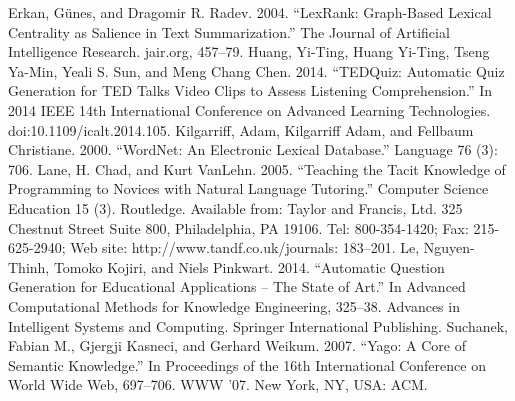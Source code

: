 \documentclass[finalcopy]{srpaper}
\begin{document}


%
%


Erkan, Günes, and Dragomir R. Radev. 2004. “LexRank: Graph-Based Lexical Centrality as Salience in Text Summarization.” The Journal of Artificial Intelligence Research. jair.org, 457–79.
\newline
Huang, Yi-Ting, Huang Yi-Ting, Tseng Ya-Min, Yeali S. Sun, and Meng Chang Chen. 2014. “TEDQuiz: Automatic Quiz Generation for TED Talks Video Clips to Assess Listening Comprehension.” In 2014 IEEE 14th International Conference on Advanced Learning Technologies. doi:10.1109/icalt.2014.105.
\newline
Kilgarriff, Adam, Kilgarriff Adam, and Fellbaum Christiane. 2000. “WordNet: An Electronic Lexical Database.” Language 76 (3): 706.
\newline
Lane, H. Chad, and Kurt VanLehn. 2005. “Teaching the Tacit Knowledge of Programming to Novices with Natural Language Tutoring.” Computer Science Education 15 (3). Routledge. Available from: Taylor and Francis, Ltd. 325 Chestnut Street Suite 800, Philadelphia, PA 19106. Tel: 800-354-1420; Fax: 215-625-2940; Web site: http://www.tandf.co.uk/journals: 183–201.
\newline
Le, Nguyen-Thinh, Tomoko Kojiri, and Niels Pinkwart. 2014. “Automatic Question Generation for Educational Applications – The State of Art.” In Advanced Computational Methods for Knowledge Engineering, 325–38. Advances in Intelligent Systems and Computing. Springer International Publishing.
\newline
Suchanek, Fabian M., Gjergji Kasneci, and Gerhard Weikum. 2007. “Yago: A Core of Semantic Knowledge.” In Proceedings of the 16th International Conference on World Wide Web, 697–706. WWW ’07. New York, NY, USA: ACM.

%
%
\end{document}

